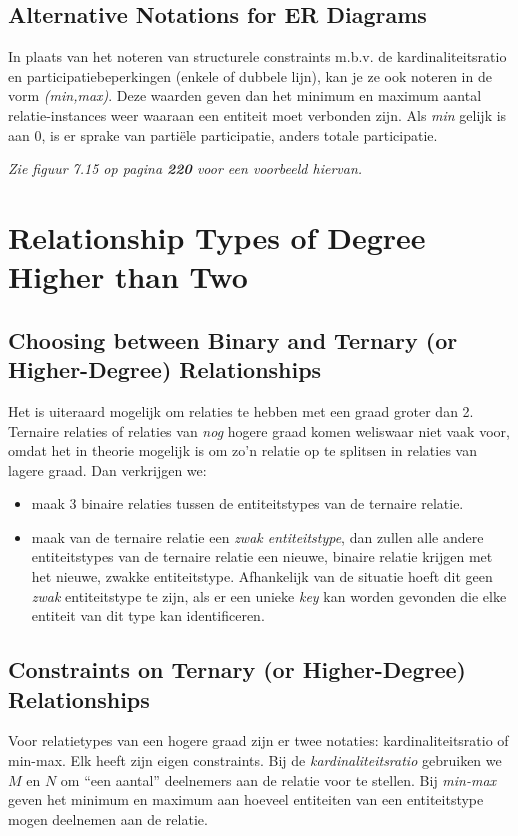 \subsection{Alternative Notations for ER Diagrams}
In plaats van het noteren van structurele constraints m.b.v. de kardinaliteitsratio en participatiebeperkingen (enkele of dubbele lijn), kan je ze ook noteren in de vorm \textit{(min,max)}. Deze waarden geven dan het minimum en maximum aantal relatie-instances weer waaraan een entiteit moet verbonden zijn. Als \textit{min} gelijk is aan 0, is er sprake van parti\"ele participatie, anders totale participatie.

\textit{Zie figuur 7.15 op pagina \textbf{220} voor een voorbeeld hiervan.}


\section{Relationship Types of Degree Higher than Two}
\subsection{Choosing between Binary and Ternary (or Higher-Degree) Relationships}
Het is uiteraard mogelijk om relaties te hebben met een graad groter dan 2. Ternaire relaties of relaties van \textit{nog} hogere graad komen weliswaar niet vaak voor, omdat het in theorie mogelijk is om zo'n relatie op te splitsen in relaties van lagere graad. Dan verkrijgen we:
\begin{itemize}
\item maak 3 binaire relaties tussen de entiteitstypes van de ternaire relatie.
\item maak van de ternaire relatie een \textit{zwak entiteitstype}, dan zullen alle andere entiteitstypes van de ternaire relatie een nieuwe, binaire relatie krijgen met het nieuwe, zwakke entiteitstype. Afhankelijk van de situatie hoeft dit geen \textit{zwak} entiteitstype te zijn, als er een unieke \textit{key} kan worden gevonden die elke entiteit van dit type kan identificeren.
\end{itemize}

\subsection{Constraints on Ternary (or Higher-Degree) Relationships}
Voor relatietypes van een hogere graad zijn er twee notaties: kardinaliteitsratio of min-max. Elk heeft zijn eigen constraints. Bij de \textit{kardinaliteitsratio} gebruiken we $M$ en $N$ om ``een aantal'' deelnemers aan de relatie voor te stellen. Bij \textit{min-max} geven het minimum en maximum aan hoeveel entiteiten van een entiteitstype mogen deelnemen aan de relatie.


